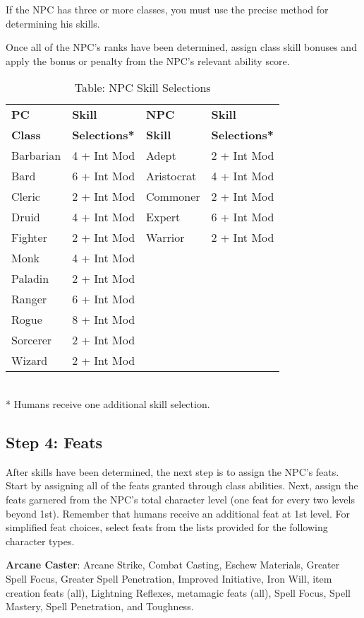 If the NPC has three or more classes, you must use the precise method for determining his skills. 
				
Once all of the NPC's ranks have been determined, assign class skill bonuses and apply the bonus or penalty from the NPC's relevant ability score.

\begin{table}[]
\sffamily
\caption{Table: NPC Skill Selections}
\begin{tabular}{ll|ll}
\textbf{PC}    & \textbf{Skill}        & \textbf{NPC}   & \textbf{Skill} \\
\textbf{Class} & \textbf{Selections*}  & \textbf{Skill} &  \textbf{Selections*}\\
Barbarian & 4 + Int Mod & Adept & 2 + Int Mod\\
Bard & 6 + Int Mod & Aristocrat &  4 + Int Mod\\
Cleric & 2 + Int Mod & Commoner & 2 + Int Mod\\
Druid & 4 + Int Mod & Expert & 6 + Int Mod\\
Fighter & 2 + Int Mod & Warrior & 2 + Int Mod\\
Monk & 4 + Int Mod &  & \\
Paladin & 2 + Int Mod &  & \\
Ranger & 6 + Int Mod &  & \\
Rogue & 8 + Int Mod &  & \\
Sorcerer & 2 + Int Mod &  & \\
Wizard & 2 + Int Mod &  & \\
\end{tabular}\\
* Humans receive one additional skill selection.\\
\end{table}

\subsection{Step 4: Feats}

				
After skills have been determined, the next step is to assign the NPC's feats. Start by assigning all of the feats granted through class abilities. Next, assign the feats garnered from the NPC's total character level (one feat for every two levels beyond 1st). Remember that humans receive an additional feat at 1st level. For simplified feat choices, select feats from the lists provided for the following character types.
				
\textbf{Arcane Caster}: Arcane Strike, Combat Casting, Eschew Materials, Greater Spell Focus, Greater Spell Penetration, Improved Initiative, Iron Will, item creation feats (all), Lightning Reflexes, metamagic feats (all), Spell Focus, Spell Mastery, Spell Penetration, and Toughness.
				

